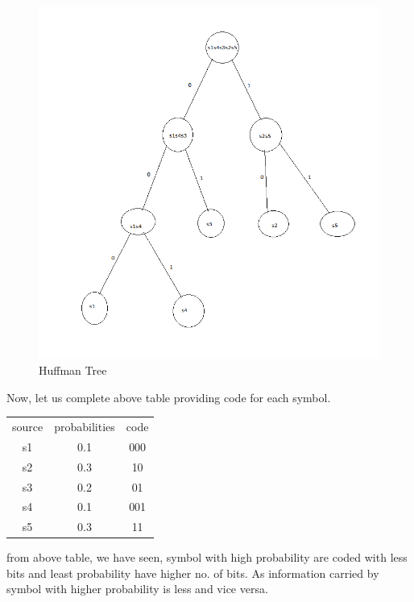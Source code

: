 \documentclass[10pt,a4paper]{article}
\begin{document}
\begin{figure}[H]
	\includegraphics[scale=0.9]{final}
	\caption{Huffman Tree} 
	\label{huffman}
\end{figure}
\hfill
Now, let us complete above table providing code for each symbol.
\begin{center}
\begin{tabular}{ c c c }
	source & probabilities & code\\
	s1 & 0.1 & 000 \\ 
	s2 & 0.3 & 10 \\  
	s3 & 0.2 & 01\\ 
	s4 & 0.1 & 001\\
	s5 & 0.3 & 11\\ 
\end{tabular}
\end{center}
from above table, we have seen, symbol with high probability are coded with less bits and least probability have higher no. of bits. As information carried by symbol with higher probability is less and vice versa.
\end{document}
